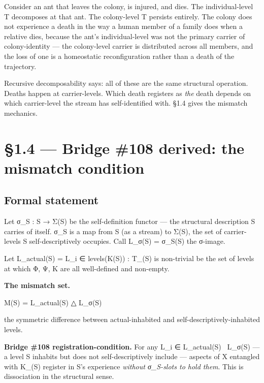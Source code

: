 \documentclass[11pt, openany]{book}
\newcommand{\sectionbreak}{\clearpage}
\begin{document}
Consider an ant that leaves the colony, is injured, and dies. The individual-level T decomposes at that ant. The colony-level T persists entirely. The colony does not experience a death in the way a human member of a family does when a relative dies, because the ant's individual-level was not the primary carrier of colony-identity --- the colony-level carrier is distributed across all members, and the loss of one is a homeostatic reconfiguration rather than a death of the trajectory.

Recursive decomposability says: all of these are the same structural operation. Deaths happen at carrier-levels. Which death registers as \textit{the} death depends on which carrier-level the stream has self-identified with. §1.4 gives the mismatch mechanics.

\sectionbreak

\section{§1.4 --- Bridge \#108 derived: the mismatch condition}

\subsection{Formal statement}

Let σ\_\allowbreak{}S : S → Σ(S) be the self-definition functor --- the structural description S carries of itself. σ\_\allowbreak{}S is a map from S (as a stream) to Σ(S), the set of carrier-levels S self-descriptively occupies. Call L\_\allowbreak{}σ(S) = σ\_\allowbreak{}S(S) the σ-image.

Let L\_\allowbreak{}actual(S) = { L\_\allowbreak{}i ∈ levels(Κ(S)) : T\_(S) is non-trivial } be the set of levels at which Φ, Ψ, Κ are all well-defined and non-empty.

\textbf{The mismatch set.}
\begin{Code}
M(S) = L_actual(S) △ L_σ(S)
\end{Code}
the symmetric difference between actual-inhabited and self-descriptively-inhabited levels.

\textbf{Bridge \#108 registration-condition.} For any L\_\allowbreak{}i ∈ L\_\allowbreak{}actual(S) \ L\_\allowbreak{}σ(S) --- a level S inhabits but does not self-descriptively include --- aspects of X entangled with Κ\_(S) register in S's experience \textit{without σ\_\allowbreak{}S-slots to hold them}. This is dissociation in the structural sense.
\end{document}
